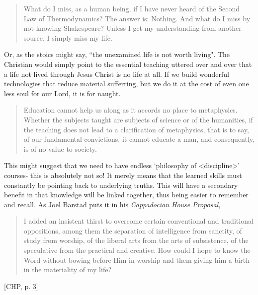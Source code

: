 \documentclass[letterpaper]{article}
\begin{document}
\begin{quote}
What do I miss, as a human being, if I have never heard of the Second Law of Thermodynamics? The answer is: Nothing. And what do I miss by not knowing Shakespeare? Unless I get my understanding from another source, I simply miss my life.
\end{quote}

Or, as the stoics might say, ``the unexamined life is not worth living". The Christian would simply point to the essential teaching uttered over and over that a life not lived through Jesus Christ is no life at all. If we build wonderful technologies that reduce material sufferring, but we do it at the cost of even one less soul for our Lord, it is for naught.

\iffalse
Indeed to harken back to Eden,

\begin{quote}
  Sorrow is knowledge; they who know the most

  Must mourn the deepest o'er the fatal truth,

  The Tree of Knowledge is not that of Life.
  \attrib{\textit{Manfred}, George Gordon Byron} %
\end{quote}
\fi

\begin{quote}
  Education cannot help us along as it accords no place to metaphysics. Whether the subjects taught are subjects of science or of the humanities, if the teaching does not lead to a clarification of metaphysics, that is to say, of our fundamental convictions, it cannot educate a man, and consequently, is of no value to society.
\end{quote}

This might suggest that we need to have endless `philosophy of <discipline>' courses- this is absolutely not so! It merely means that the learned skills must constantly be pointing back to underlying truths. This will have a secondary benefit in that knowledge will be linked together, thus being easier to remember and recall. As Joel Barstad puts it in his \textit{Cappadocian House Proposal},

\begin{quote}
  I added an insistent thirst to overcome certain conventional and traditional oppositions, among them the separation of intelligence from sanctity, of study from worship, of the liberal arts from the arts of subsistence, of the speculative from the practical and creative. How could I hope to know the Word without bowing before Him in worship and them giving him a birth in the materiality of my life?
\end{quote} [CHP, p. 3]
\end{document}
